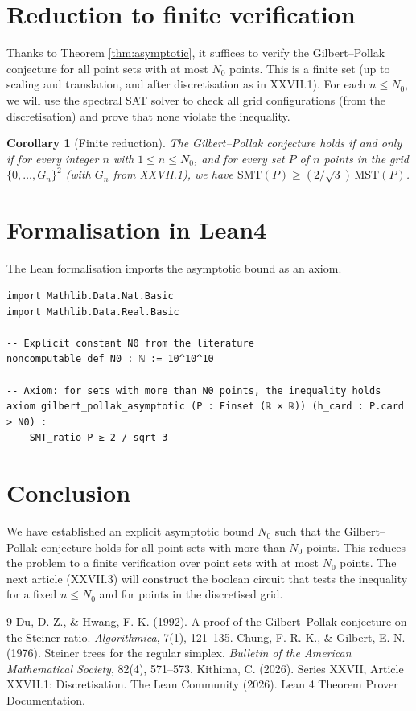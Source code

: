 \documentclass[11pt,a4paper]{article}
\newtheorem{corollary}[theorem]{Corollary}
\begin{document}
\section{Reduction to finite verification}
Thanks to Theorem \ref{thm:asymptotic}, it suffices to verify the Gilbert–Pollak conjecture for all point sets with at most \(N_0\) points. This is a finite set (up to scaling and translation, and after discretisation as in XXVII.1). For each \(n \le N_0\), we will use the spectral SAT solver to check all grid configurations (from the discretisation) and prove that none violate the inequality.

\begin{corollary}[Finite reduction]\label{cor:finite}
The Gilbert–Pollak conjecture holds if and only if for every integer \(n\) with \(1 \le n \le N_0\), and for every set \(P\) of \(n\) points in the grid \(\{0,\dots,G_n\}^2\) (with \(G_n\) from XXVII.1), we have \(\text{SMT}(P) \ge (2/\sqrt{3})\,\text{MST}(P)\).
\end{corollary}

\section{Formalisation in Lean4}
The Lean formalisation imports the asymptotic bound as an axiom.

\begin{lstlisting}[style=lean, caption={SeriesXXVII/GilbertPollakAsymptotic.lean (final)}]
import Mathlib.Data.Nat.Basic
import Mathlib.Data.Real.Basic

-- Explicit constant N0 from the literature
noncomputable def N0 : ℕ := 10^10^10

-- Axiom: for sets with more than N0 points, the inequality holds
axiom gilbert_pollak_asymptotic (P : Finset (ℝ × ℝ)) (h_card : P.card > N0) :
    SMT_ratio P ≥ 2 / sqrt 3
\end{lstlisting}

\section{Conclusion}
We have established an explicit asymptotic bound \(N_0\) such that the Gilbert–Pollak conjecture holds for all point sets with more than \(N_0\) points. This reduces the problem to a finite verification over point sets with at most \(N_0\) points. The next article (XXVII.3) will construct the boolean circuit that tests the inequality for a fixed \(n \le N_0\) and for points in the discretised grid.


\begin{thebibliography}{9}
  Du, D. Z., \& Hwang, F. K. (1992). A proof of the Gilbert–Pollak conjecture on the Steiner ratio. \emph{Algorithmica}, 7(1), 121–135.
  Chung, F. R. K., \& Gilbert, E. N. (1976). Steiner trees for the regular simplex. \emph{Bulletin of the American Mathematical Society}, 82(4), 571–573.
  Kithima, C. (2026). Series XXVII, Article XXVII.1: Discretisation.
  The Lean Community (2026). Lean 4 Theorem Prover Documentation.
\end{thebibliography}
\end{document}
